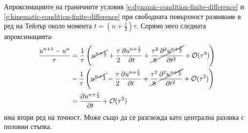 \documentclass[12pt]{article}
\numberwithin{equation}{section}
\begin{document}
Апроксимациите на граничните условия \autoref{e:dynamic-condition-finite-difference} и \autoref{e:kinematic-condition-finite-difference} при свободната повърхност развиваме в ред на Тейлър около момента $t = (n+\frac{1}{2})\tau$. Спрямо него следната апроксимацията:
\begin{equation}
    \label{e:local-error-time-deriv}
    \begin{aligned}
        \frac{u^{n+1} - u^n}{\tau} &=
        \frac{1}{\tau} \left( \cancel{u^{n+\frac{1}{2}}} + \frac{\tau}{2}\frac{\partial u^{n+\frac{1}{2}}}{\partial t} + \cancel{\frac{\tau^2}{8}\frac{\partial^2 u^{n+\frac{1}{2}}}{\partial t^2}} + \mathcal{O}(\tau^3) \right) \\
        &- \frac{1}{\tau} \left( \cancel{u^{n+\frac{1}{2}}} - \frac{\tau}{2}\frac{\partial u^{n+\frac{1}{2}}}{\partial t} + \cancel{\frac{\tau^2}{8}\frac{\partial^2 u^{n+\frac{1}{2}}}{\partial t^2}} + \mathcal{O}(\tau^3) \right) \\
        &= \frac{\partial u^{n+\frac{1}{2}}}{\partial t} + \mathcal{O}(\tau^2)
    \end{aligned}
\end{equation}
има втори ред на точност. Може също да се разглежда като централна разлика с половин стъпка.
\end{document}
